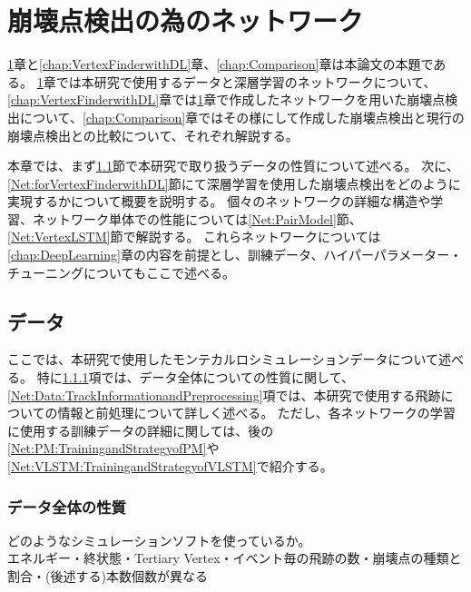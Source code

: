 
\chapter{崩壊点検出の為のネットワーク} \label{chap:Networks}

\ref{chap:Networks}章と\ref{chap:VertexFinderwithDL}章、\ref{chap:Comparison}章は本論文の本題である。
\ref{chap:Networks}章では本研究で使用するデータと深層学習のネットワークについて、\ref{chap:VertexFinderwithDL}章では\ref{chap:Networks}章で作成したネットワークを用いた崩壊点検出について、\ref{chap:Comparison}章ではその様にして作成した崩壊点検出と現行の崩壊点検出との比較について、それぞれ解説する。

本章では、まず\ref{Net:Data}節で本研究で取り扱うデータの性質について述べる。
次に、\ref{Net:forVertexFinderwithDL}節にて深層学習を使用した崩壊点検出をどのように実現するかについて概要を説明する。
個々のネットワークの詳細な構造や学習、ネットワーク単体での性能については\ref{Net:PairModel}節、\ref{Net:VertexLSTM}節で解説する。
これらネットワークについては\ref{chap:DeepLearning}章の内容を前提とし、訓練データ、ハイパーパラメーター・チューニングについてもここで述べる。

\section{データ} \label{Net:Data}

ここでは、本研究で使用したモンテカルロシミュレーションデータについて述べる。
特に\ref{Net:Data:DataProperty}項では、データ全体についての性質に関して、\ref{Net:Data:TrackInformationandPreprocessing}項では、本研究で使用する飛跡についての情報と前処理について詳しく述べる。
ただし、各ネットワークの学習に使用する訓練データの詳細に関しては、後の\ref{Net:PM:TrainingandStrategyofPM}や\ref{Net:VLSTM:TrainingandStrategyofVLSTM}で紹介する。

\subsection{データ全体の性質} \label{Net:Data:DataProperty}

どのようなシミュレーションソフトを使っているか。\\
エネルギー・終状態・Tertiary Vertex・イベント毎の飛跡の数・崩壊点の種類と割合・(後述する)本数個数が異なる

